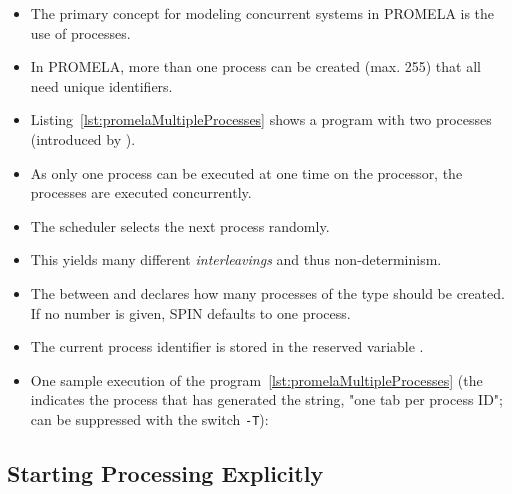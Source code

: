 		\begin{itemize}
			\item The primary concept for modeling concurrent systems in PROMELA is the use of processes.
			\item In PROMELA, more than one process can be created (max. 255) that all need unique identifiers.
			\item Listing~\ref{lst:promelaMultipleProcesses} shows a program with two processes (introduced by ).
			\item As only one process can be executed at one time on the processor, the processes are executed concurrently.
			\item The scheduler selects the next process randomly.
			\item This yields many different \textit{interleavings} and thus non-determinism.
			\item The \inlinePromela{[2]} between  and  declares how many processes of the type should be created. If no number is given, SPIN defaults to one process.
			\item The current process identifier is stored in the reserved variable .
			\item One sample execution of the program~\ref{lst:promelaMultipleProcesses} (the indicates the process that has generated the string, "one tab per process ID"; can be suppressed with the switch \texttt{-T}):
		\end{itemize}

	\subsection{Starting Processing Explicitly}
		

